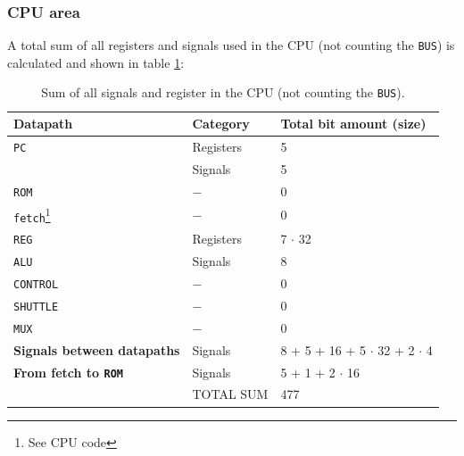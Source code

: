 \subsubsection{CPU area}
\label{sec:cpuArea}

A total sum of all registers and signals used in the CPU (not counting the \texttt{BUS}) is calculated and shown in table \ref{tabel:areaSum}:

\begin{table}[H]
\begin{center}
    \begin{tabular}{|l|l|l|}
    \hline
    \textbf{Datapath}                          & \textbf{Category}   & \textbf{Total bit amount (size)}                       \\ \hline
    \texttt{PC}                                 & Registers & 5                                \\
    ~                                  & Signals   & 5                                \\ \hline
    \texttt{ROM}                                & $-$       & 0                                \\ \hline
    \texttt{fetch}\footnote{See CPU code}                              & $-$       & 0                                \\ \hline
    \texttt{REG}                                & Registers & 7 $\cdot$ 32 \\ \hline
    \texttt{ALU}                                & Signals   & 8                                \\ \hline
    \texttt{CONTROL}                            & $-$       & 0                                \\ \hline
    \texttt{SHUTTLE}                            & $-$       & 0                                \\ \hline
    \texttt{MUX}                                & $-$       & 0                                \\ \hline \hline
    \textbf{Signals between datapaths}  & Signals   & 8 + 5 + 16 + 5 $\cdot$ 32 + 2 $\cdot$ 4          \\ \hline \hline
    \textbf{From fetch to \texttt{ROM}} & Signals   & 5 + 1 +  2 $\cdot$ 16                    \\ \hline \hline
    ~                                  & TOTAL SUM & 477                              \\ \hline
    \end{tabular}
    \caption{Sum of all signals and register in the CPU (not counting the \texttt{BUS}).}
    \label{tabel:areaSum}
    \end{center}
\end{table}

